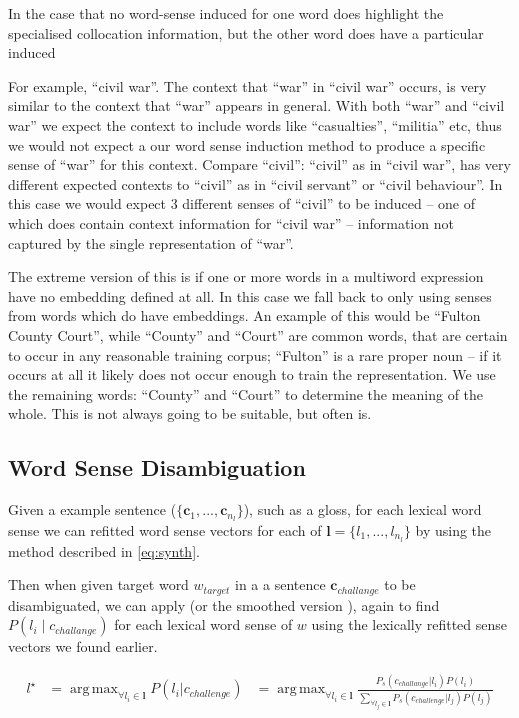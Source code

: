 \documentclass{sig-alternate}
\renewcommand{\c}{\mathbf{c}}
\renewcommand{\l}{\mathbf{l}}
\DeclareMathOperator*{\argmax}{arg\,max}
\begin{document}
In the case that no word-sense induced for one word does highlight the specialised collocation information, but the other word does have a particular induced

For example, ``civil war''. The context that ``war'' in ``civil war'' occurs, is very similar to the context that ``war'' appears in general. With both ``war'' and ``civil war'' we expect the context to include words like ``casualties'', ``militia'' etc, thus we would not expect a our word sense induction method to produce a specific sense of ``war'' for this context.
Compare ``civil'': ``civil'' as in ``civil war'', has very different expected contexts to ``civil'' as in ``civil servant'' or ``civil behaviour''. In this case we would expect 3 different senses of ``civil'' to be induced -- one of which does contain context information for ``civil war'' -- information not captured by the single representation of ``war''.

The extreme version of this is if one or more words in a multiword expression have no embedding defined at all. In this case we fall back to only using senses from words which do have embeddings. An example of this would be ``Fulton County Court'', while ``County'' and ``Court'' are common words, that are certain to occur in any reasonable training corpus; ``Fulton'' is a rare proper noun -- if it occurs at all it likely does not occur enough to train the representation. We use the remaining words: ``County'' and ``Court'' to determine the meaning of the whole. This is not always going to be suitable, but often is.

\subsection{Word Sense Disambiguation} \label{lexicalWSD}
Given a example sentence ($\{\c_1,...,\c_{n_l}\}$), such as a gloss, for each lexical word sense we can refitted word sense vectors for each of $\l=\{l_1,..., l_{n_l}\}$ by using the method described in \cref{eq:synth}.

Then when given target word $w_{target}$ in a a sentence $\c_{challange}$ to be disambiguated, we can apply  (or the smoothed version ), again to find $P(l_i \mid c_{challange})$ for each lexical word sense of $w$ using the lexically refitted sense vectors we found earlier.

\[
\begin{aligned}\label{eq:lexicalwsd}
l^\star &= \argmax_{\forall l_i \in \l} P(l_i|c_{challenge})
&= \argmax_{\forall l_i \in \l} \frac{P_s(c_{challange}|l_i)P(l_i)}{\sum_{\forall l_j \in \l} P_s(c_{challenge}|l_j)P(l_j)}
\end{aligned}
\]
\end{document}

